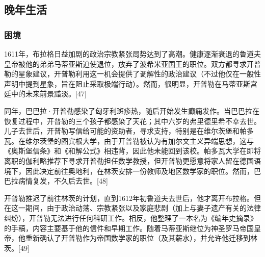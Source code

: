 \subsection{晚年生活}
\subsubsection{困境}
1611年，布拉格日益加剧的政治宗教紧张局势达到了高潮。健康逐渐衰退的鲁道夫皇帝被他的弟弟马蒂亚斯迫使退位，放弃了波希米亚国王的职位。双方都寻求开普勒的星象建议，开普勒利用这一机会提供了调解性的政治建议（不过他仅在一般性声明中提到星象，旨在阻止采取极端行动）。然而，很明显，开普勒在马蒂亚斯宫廷中的未来前景黯淡。[47]

同年，巴巴拉·开普勒感染了匈牙利斑疹热，随后开始发生癫痫发作。当巴巴拉在恢复过程中，开普勒的三个孩子都感染了天花；其中六岁的弗里德里希不幸去世。儿子去世后，开普勒写信给可能的资助者，寻求支持，特别是在维尔茨堡和帕多瓦。在维尔茨堡的图宾根大学，由于开普勒被认为有加尔文主义异端思想，这与《奥斯堡信条》和《和解公式》相违背，因此他未能回到该校。帕多瓦大学在即将离职的伽利略推荐下寻求开普勒担任数学教授，但开普勒更愿意将家人留在德国语境下，因此决定前往奥地利，在林茨安排一份教师及地区数学家的职位。然而，巴巴拉病情复发，不久后去世。[48]

开普勒推迟了前往林茨的计划，直到1612年初鲁道夫去世后，他才离开布拉格。但在这一期间，由于政治动荡、宗教紧张以及家庭悲剧（加上与妻子遗产有关的法律纠纷），开普勒无法进行任何科研工作。相反，他整理了一本名为《编年史摘录》的手稿，内容主要基于他的信件和早期工作。随着马蒂亚斯继位为神圣罗马帝国皇帝，他重新确认了开普勒作为帝国数学家的职位（及其薪水），并允许他迁移到林茨。[49]